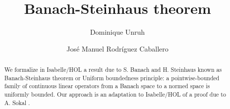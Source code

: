 \documentclass[11pt,a4paper]{article}
\begin{document}
\title{Banach-Steinhaus theorem}
\author{Dominique Unruh \and Jos\'e Manuel Rodr\'iguez Caballero}
\maketitle

\begin{abstract}
We formalize in Isabelle/HOL a result \cite{Weisstein_UBP} due to S. Banach and H. Steinhaus \cite{banach1927principe} known as Banach-Steinhaus theorem or Uniform boundedness principle: a pointwise-bounded family of continuous linear operators from a Banach space to a normed space is uniformly bounded. Our approach is an adaptation to Isabelle/HOL of a proof due to A. Sokal \cite{sokal2011really}.
\end{abstract}

\tableofcontents






\end{document}
